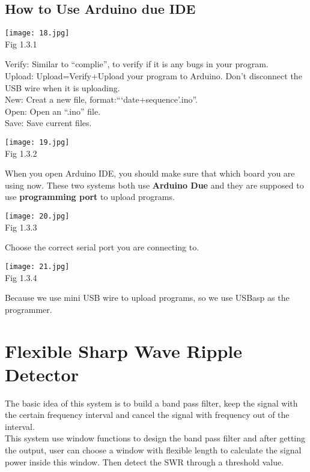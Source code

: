 \documentclass[12pt]{report}
\begin{document}
\section{\large How to Use Arduino due IDE}
\begin{center}
\texttt{[image: 18.jpg]}\\
\textup{\footnotesize Fig 1.3.1}
\end{center}
\newpage
\begin{flushleft}
\textup{Verify: Similar to ``complie'', to verify if it is any bugs in your program.\\Upload: Upload=Verify+Upload your program to Arduino. Don't disconnect the USB wire when it is uploading.\\New: Creat a new file, format:```date+sequence'.ino''.\\Open: Open an ``.ino'' file.\\Save: Save current files.\\}
\end{flushleft}
\vspace{10pt}
\begin{center}
\texttt{[image: 19.jpg]}\\
\textup{\footnotesize Fig 1.3.2}
\end{center}
\textup{When you open Arduino IDE, you should make sure that which board you are using now. These two systems both use }
\textbf{Arduino Due }
\textup{and they are supposed to use }
\textbf{programming port }
\textup{to upload programs.}
\begin{center}
\texttt{[image: 20.jpg]}\\
\textup{\footnotesize Fig 1.3.3}
\end{center}
\textup{Choose the correct serial port you are connecting to.}
\begin{center}
\texttt{[image: 21.jpg]}\\
\textup{\footnotesize Fig 1.3.4}
\end{center}
\textup{Because we use mini USB wire to upload programs, so we use USBasp as the programmer.}
\chapter{\Large Flexible Sharp Wave Ripple Detector}
\textup{The basic idea of this system is to build a band pass filter, keep the signal with the certain frequency interval and cancel the signal with frequency out of the interval.\\This system use window functions to design the band pass filter and after getting the output, user can choose a window with flexible length to calculate the signal power inside this window. Then detect the SWR through a threshold value.}
\end{document}
